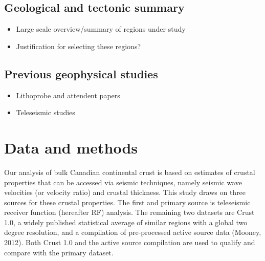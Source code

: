 \documentclass[draft, 12pt]{article}
\begin{document}
\subsection{Geological and tectonic summary}
\begin{itemize}

\item Large scale overview/summary of regions under study
\item Justification for selecting these regions?

\end{itemize}

\subsection{Previous geophysical studies}
\begin{itemize}

\item Lithoprobe and attendent papers
\item Teleseismic studies

\end{itemize}





\section{Data and methods}
Our analysis of bulk Canadian continental crust is based on estimates of crustal properties that can be accessed via seismic techniques, namely seismic wave velocities (or velocity ratio) and crustal thickness. This study draws on three sources for these crustal properties. The first and primary source is teleseismic receiver function (hereafter RF) analysis. The remaining two datasets are Crust 1.0, a widely published statistical average of similar regions with a global two degree resolution, and a compilation of pre-processed active source data (Mooney, 2012). Both Crust 1.0 and the active source compilation are used to qualify and compare with the primary dataset.
\end{document}
